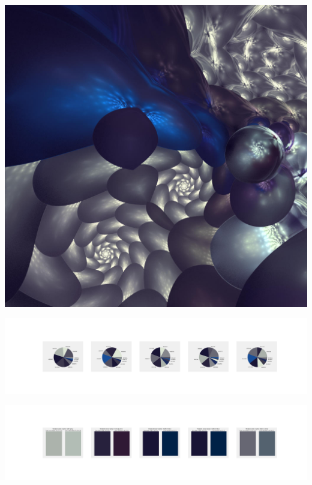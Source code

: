 \documentclass[11pt]{article}
\begin{document}
\begin{landscape}
    \begin{center}
    \includegraphics[width=\textwidth]{./nbimg/file (332).jpg}
    \end{center}

    \begin{center}
    \includegraphics[width=250mm]{./nbimg/pie-259.jpg}
    \end{center}

    \begin{center}
    \includegraphics[width=250mm]{./nbimg/peak-259.jpg}
    \end{center}
    


\end{landscape}
\end{document}
